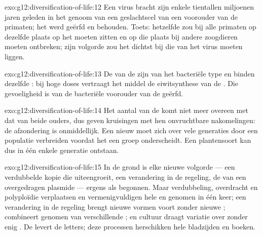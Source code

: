 \begin{solution}{exo:g12:diversification-of-life:12}
Een virus bracht zijn  enkele tientallen miljoenen jaren geleden in het
genoom van een geslachtscel van een voorouder van de primaten; het 
werd geërfd en behouden. Toets: hetzelfde  zou bij alle primaten op
dezelfde plaats op het  moeten zitten en op die plaats bij
andere zoogdieren moeten ontbreken; zijn volgorde zou het dichtst bij die
van het virus moeten liggen.
\end{solution}

\begin{solution}{exo:g12:diversification-of-life:13}
De  van de  zijn van het bacteriële type en binden
dezelfde : bij hoge doses vertraagt het middel de
eiwitsynthese van de . Die gevoeligheid is van de bacteriële
voorouder van de  geërfd.
\end{solution}

\begin{solution}{exo:g12:diversification-of-life:14}
Het aantal  van de  komt niet meer overeen met dat
van beide ouders, dus geven kruisingen met hen onvruchtbare nakomelingen:
de afzondering is onmiddellijk. Een nieuw  moet zich over vele
generaties door een populatie verbreiden voordat het een groep
onderscheidt. Een plantensoort kan dus in één enkele generatie ontstaan.
\end{solution}

\begin{solution}{exo:g12:diversification-of-life:15}
In de grond is elke nieuwe volgorde --- een verdubbelde kopie die
uiteengroeit, een verandering in de regeling, de  van een
overgedragen plasmide --- ergens als  begonnen. Maar verdubbeling,
overdracht en polyploïdie verplaatsen en vermenigvuldigen hele  en
genomen in één keer; een verandering in de regeling brengt nieuwe vormen
voort zonder nieuwe ;  combineert genomen van
verschillende ; en cultuur draagt variatie over zonder enig .
De  levert de letters; deze processen herschikken hele bladzijden
en boeken.
\end{solution}

